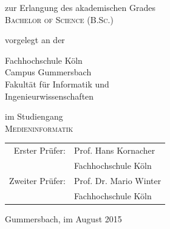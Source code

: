 \begin{titlepage}
\begin{center}
\vspace{1.0cm}

\begin{large}
zur Erlangung des akademischen Grades\\
\vspace{0.2cm}
\textsc{Bachelor of Science (B.Sc.)}\\ 
\end{large}

\vspace{0.4cm}

\begin{large}
vorgelegt an der\\ 
\vspace{0.2cm}
\begin{scshape}
Fachhochschule Köln\\
Campus Gummersbach\\
Fakultät für Informatik und\\
Ingenieurwissenschaften\\
\end{scshape}
\end{large}

\vspace{0.4cm}

\begin{large}
im Studiengang\\ 
\vspace{0.2cm}
\textsc{Medieninformatik}
\end{large}


\vspace{1.0cm}

\begin{tabular}{rl}
        Erster Prüfer:  &  Prof. Hans Kornacher\\
       					&  \small Fachhochschule Köln \\[1.0em]
       Zweiter Prüfer:  &  Prof. Dr. Mario Winter\\
       					&  \small Fachhochschule Köln\\
\end{tabular}

\vspace{0.6cm}

\begin{large}
Gummersbach, im August 2015
\end{large}

\end{center}


\end{titlepage}

